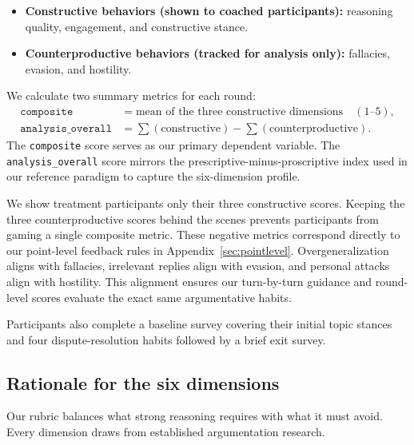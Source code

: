 \documentclass[11pt]{article}
\begin{document}
\begin{itemize}[nosep]
  \item \textbf{Constructive behaviors (shown to coached participants):} reasoning quality, engagement, and constructive stance.
  \item \textbf{Counterproductive behaviors (tracked for analysis only):} fallacies, evasion, and hostility.
\end{itemize}

We calculate two summary metrics for each round:
\begin{align*}
  \texttt{composite} &= \text{mean of the three constructive dimensions} \quad (1\text{--}5),\\
  \texttt{analysis\_overall} &= \textstyle\sum(\text{constructive}) - \sum(\text{counterproductive}).
\end{align*}
The \texttt{composite} score serves as our primary dependent variable. The \texttt{analysis\_overall} score mirrors the prescriptive-minus-proscriptive index used in our reference paradigm to capture the six-dimension profile.

We show treatment participants only their three constructive scores. Keeping the three counterproductive scores behind the scenes prevents participants from gaming a single composite metric. These negative metrics correspond directly to our point-level feedback rules in Appendix~\ref{sec:pointlevel}. Overgeneralization aligns with fallacies, irrelevant replies align with evasion, and personal attacks align with hostility. This alignment ensures our turn-by-turn guidance and round-level scores evaluate the exact same argumentative habits.

Participants also complete a baseline survey covering their initial topic stances and four dispute-resolution habits followed by a brief exit survey.

\subsection{Rationale for the six dimensions}
\label{sec:whydims}

Our rubric balances what strong reasoning requires with what it must avoid. Every dimension draws from established argumentation research.
\end{document}
